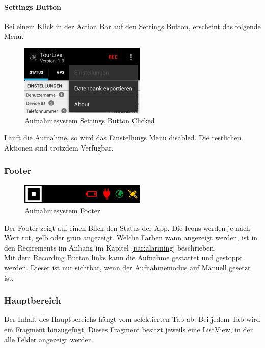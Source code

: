 \paragraph{Settings Button}
Bei einem Klick in der Action Bar auf den Settings Button, erscheint das folgende Menu.

\begin{figure}[H]
	\centering
	\includegraphics[width=60mm]{images/android/settingsclicked.png}
	\caption{Aufnahmesystem Settings Button Clicked}
\end{figure}

Läuft die Aufnahme, so wird das Einstellungs Menu disabled. Die restlichen Aktionen sind trotzdem Verfügbar.


\subsubsection{Footer}
\begin{figure}[H]
	\centering
	\includegraphics[width=60mm]{images/android/footer.png}
	\caption{Aufnahmesystem Footer}
\end{figure}
Der Footer zeigt auf einen Blick den Status der App. Die Icons werden je nach Wert rot, gelb oder grün angezeigt. Welche Farben wann angezeigt werden, ist in den Reqirements im Anhang im Kapitel \ref{par:alarming} beschrieben.\\
Mit dem Recording Button links kann die Aufnahme gestartet und gestoppt werden. Dieser ist nur sichtbar, wenn der Aufnahmemodus auf Manuell gesetzt ist.


\subsubsection{Hauptbereich}
Der Inhalt des Hauptbereichs hängt vom selektierten Tab ab. Bei jedem Tab wird ein Fragment hinzugefügt. Dieses Fragment besitzt jeweils eine ListView, in der alle Felder angezeigt werden. 

\pagebreak
